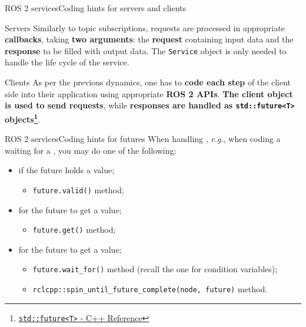 \begin{frame}{ROS 2 services}{Coding hints for servers and clients}
  \begin{block}{Servers}
    \justifying
    Similarly to topic subscriptions, requests are processed in appropriate \textbf{callbacks}, taking \textbf{two arguments}: the \textbf{request} containing input data and the \textbf{response} to be filled with output data. The \texttt{Service} object is only needed to handle the life cycle of the service.
  \end{block}
  \begin{block}{Clients}
    \justifying
    As per the previous dynamics, one has to \textbf{code each step} of the client side into their application using appropriate \textbf{ROS 2 APIs}. \textbf{The client object is used to send requests}, while \textbf{responses are handled as \texttt{std::future<T>} objects\footnote{\href{https://en.cppreference.com/w/cpp/thread/future}{\color{blue}\underline{\texttt{std::future<T>} - C++ Reference}}}}.
  \end{block}
\end{frame}
\begin{frame}{ROS 2 services}{Coding hints for futures}
  \justifying
  When handling , \emph{e.g.}, when coding a  waiting for a , you may do one of the following:
  \begin{itemize}
    \item {} if the future holds a value;
      \begin{itemize}
        \item \texttt{future.valid()} method;
      \end{itemize}
    \item {} for the future to get a value;
      \begin{itemize}
        \item \texttt{future.get()} method;
      \end{itemize}
    \item {} for the future to get a value;
      \begin{itemize}
        \item \texttt{future.wait\_for()} method (recall the one for condition variables);
        \item \texttt{rclcpp::spin\_until\_future\_complete(node, future)} method.
      \end{itemize}
  \end{itemize}
\end{frame}
